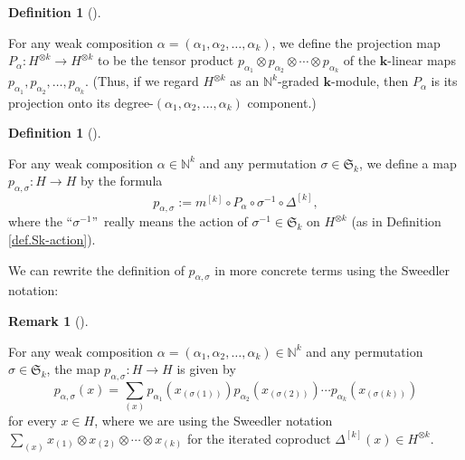 \documentclass[numbers=enddot,12pt,final,onecolumn,notitlepage]{scrartcl}%
\theoremstyle{definition}
\newtheorem{defi}[theo]{Definition}
\newenvironment{definition}[1][]
{\begin{defi}[#1]\begin{leftbar}}
{\end{leftbar}\end{defi}}
\newtheorem{remk}[theo]{Remark}
\newenvironment{remark}[1][]
{\begin{remk}[#1]\begin{leftbar}}
{\end{leftbar}\end{remk}}
\let\sumnonlimits\sum
\renewcommand{\sum}{\sumnonlimits\limits}
\begin{document}
\begin{definition}
\label{def.Palpha}For any weak composition $\alpha=\left(  \alpha_{1}%
,\alpha_{2},\ldots,\alpha_{k}\right)  $, we define the projection map
$P_{\alpha}:H^{\otimes k}\rightarrow H^{\otimes k}$ to be the tensor product
$p_{\alpha_{1}}\otimes p_{\alpha_{2}}\otimes\cdots\otimes p_{\alpha_{k}}$ of
the $\mathbf{k}$-linear maps $p_{\alpha_{1}},p_{\alpha_{2}},\ldots
,p_{\alpha_{k}}$. (Thus, if we regard $H^{\otimes k}$ as an $\mathbb{N}^{k}%
$-graded $\mathbf{k}$-module, then $P_{\alpha}$ is its projection onto its
degree-$\left(  \alpha_{1},\alpha_{2},\ldots,\alpha_{k}\right)  $ component.)
\end{definition}

\begin{definition}
\label{def.pas}For any weak composition $\alpha\in\mathbb{N}^{k}$ and any
permutation $\sigma\in\mathfrak{S}_{k}$, we define a map $p_{\alpha,\sigma
}:H\rightarrow H$ by the formula%
\begin{equation}
p_{\alpha,\sigma}:=m^{\left[  k\right]  }\circ P_{\alpha}\circ\sigma^{-1}%
\circ\Delta^{\left[  k\right]  }, \label{eq.pas.formal-def}%
\end{equation}
where the \textquotedblleft$\sigma^{-1}$\textquotedblright\ really means the
action of $\sigma^{-1}\in\mathfrak{S}_{k}$ on $H^{\otimes k}$ (as in
Definition \ref{def.Sk-action}).
\end{definition}

We can rewrite the definition of $p_{\alpha,\sigma}$ in more concrete terms
using the Sweedler notation:

\begin{remark}
\label{rmk.pas.informal-def}For any weak composition $\alpha=\left(
\alpha_{1},\alpha_{2},\ldots,\alpha_{k}\right)  \in\mathbb{N}^{k}$ and any
permutation $\sigma\in\mathfrak{S}_{k}$, the map $p_{\alpha,\sigma
}:H\rightarrow H$ is given by%
\[
p_{\alpha,\sigma}\left(  x\right)  =\sum_{\left(  x\right)  }p_{\alpha_{1}%
}\left(  x_{\left(  \sigma\left(  1\right)  \right)  }\right)  p_{\alpha_{2}%
}\left(  x_{\left(  \sigma\left(  2\right)  \right)  }\right)  \cdots
p_{\alpha_{k}}\left(  x_{\left(  \sigma\left(  k\right)  \right)  }\right)
\]
for every $x\in H$, where we are using the Sweedler notation $\sum_{\left(
x\right)  }x_{\left(  1\right)  }\otimes x_{\left(  2\right)  }\otimes
\cdots\otimes x_{\left(  k\right)  }$ for the iterated coproduct
$\Delta^{\left[  k\right]  }\left(  x\right)  \in H^{\otimes k}$.
\end{remark}
\end{document}
